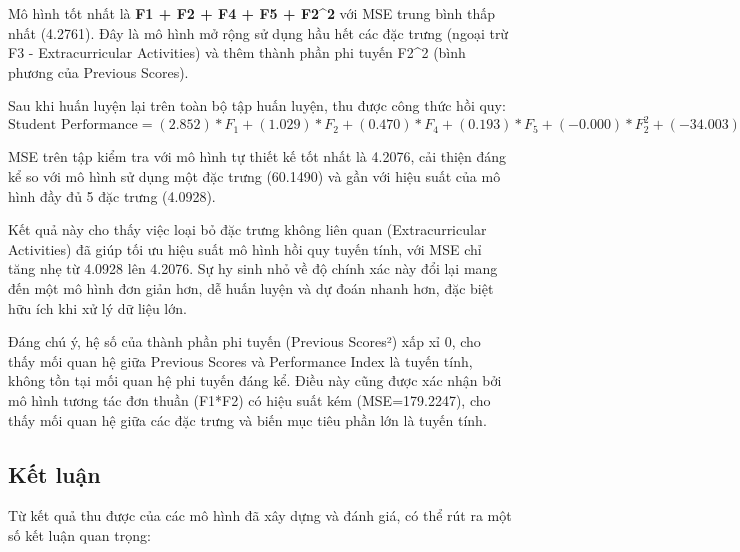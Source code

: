 Mô hình tốt nhất là \textbf{F1 + F2 + F4 + F5 + F2\^{}2} với MSE trung bình thấp nhất (4.2761). Đây là mô hình mở rộng sử dụng hầu hết các đặc trưng (ngoại trừ F3 - Extracurricular Activities) và thêm thành phần phi tuyến F2\^{}2 (bình phương của Previous Scores).

Sau khi huấn luyện lại trên toàn bộ tập huấn luyện, thu được công thức hồi quy:
$$\text{Student Performance} = (2.852)*F_1 + (1.029)*F_2 + (0.470)*F_4 + (0.193)*F_5 + (-0.000)*F_2^2 + (-34.003)$$

MSE trên tập kiểm tra với mô hình tự thiết kế tốt nhất là 4.2076, cải thiện đáng kể so với mô hình sử dụng một đặc trưng (60.1490) và gần với hiệu suất của mô hình đầy đủ 5 đặc trưng (4.0928).

Kết quả này cho thấy việc loại bỏ đặc trưng không liên quan (Extracurricular Activities) đã giúp tối ưu hiệu suất mô hình hồi quy tuyến tính, với MSE chỉ tăng nhẹ từ 4.0928 lên 4.2076. Sự hy sinh nhỏ về độ chính xác này đổi lại mang đến một mô hình đơn giản hơn, dễ huấn luyện và dự đoán nhanh hơn, đặc biệt hữu ích khi xử lý dữ liệu lớn.

Đáng chú ý, hệ số của thành phần phi tuyến (Previous Scores²) xấp xỉ 0, cho thấy mối quan hệ giữa Previous Scores và Performance Index là tuyến tính, không tồn tại mối quan hệ phi tuyến đáng kể. Điều này cũng được xác nhận bởi mô hình tương tác đơn thuần (F1*F2) có hiệu suất kém (MSE=179.2247), cho thấy mối quan hệ giữa các đặc trưng và biến mục tiêu phần lớn là tuyến tính.

\subsection{Kết luận}
Từ kết quả thu được của các mô hình đã xây dựng và đánh giá, có thể rút ra một số kết luận quan trọng:


